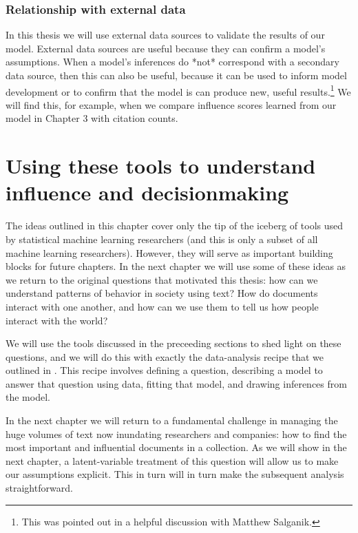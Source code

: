 \subsubsection{Relationship with external data}
In this thesis we will use external data sources to validate the
results of our model.  External data sources are useful because they
can confirm a model's assumptions.  When a model's inferences do *not*
correspond with a secondary data source, then this can also be useful,
because it can be used to inform model development or to confirm that
the model is can produce new, useful results.\footnote{This was
  pointed out in a helpful discussion with Matthew Salganik.}  We will
find this, for example, when we compare influence scores learned from
our model in Chapter 3 with citation counts.

\section{Using these tools to understand influence and decisionmaking}

The ideas outlined in this chapter cover only the tip of the iceberg
of tools used by statistical machine learning researchers
(and this is only a subset of all machine learning researchers).
However, they will serve as important building blocks for future
chapters.  In the next chapter we will use some of these ideas as we
return to the original questions that motivated this thesis: how can
we understand patterns of behavior in society using text?  How do
documents interact with one another, and how can we use them to tell
us how people interact with the world?

We will use the tools discussed in the preceeding sections to shed
light on these questions, and we will do this with exactly the
data-analysis recipe that we outlined in
.  This recipe involves defining a question,
describing a model to answer that question using data, fitting that
model, and drawing inferences from the model.
 
In the next chapter we will return to a fundamental challenge in
managing the huge volumes of text now inundating researchers and
companies: how to find the most important and influential documents in
a collection.  As we will show in the next chapter, a latent-variable
treatment of this question will allow us to make our assumptions
explicit.  This in turn will in turn make the subsequent analysis
straightforward.
